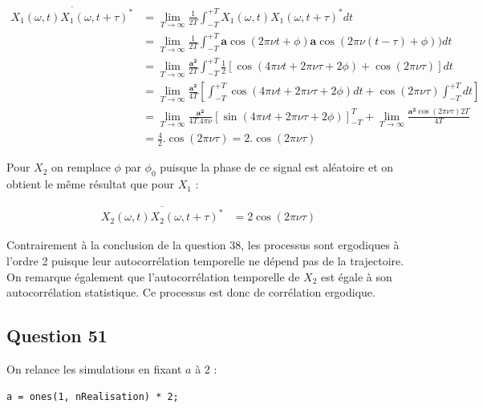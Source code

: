 \documentclass{article}
\begin{document}
\begin{equation}
\begin{aligned}
\overline{X_1(\omega,t)X_1(\omega,t+\tau)^*}
& = \lim_{T\rightarrow\infty} \frac{1}{2T}\int_{-T}^{+T}X_1(\omega,t)X_1(\omega,t+\tau)^*dt \\
& = \lim_{T\rightarrow\infty} \frac{1}{2T}\int_{-T}^{+T} \boldsymbol{a}\cos(2\pi\nu t +\phi)\boldsymbol{a}\cos(2\pi\nu(t-\tau) +\phi)) dt \\
& = \lim_{T\rightarrow\infty} \frac{\boldsymbol{a^2}}{2T}\int_{-T}^{+T} \frac{1}{2}[\cos(4\pi\nu t + 2\pi\nu\tau + 2\phi) + \cos(2\pi\nu\tau)] dt \\
& = \lim_{T\rightarrow\infty} \frac{\boldsymbol{a^2}}{4T} [\int_{-T}^{+T} \cos(4\pi\nu t + 2\pi\nu\tau + 2\phi) dt + \cos(2\pi\nu\tau) \int_{-T}^{+T} dt] \\
& = \lim_{T\rightarrow\infty} \frac{\boldsymbol{a^2}}{4T.4\pi\nu}[\sin(4\pi\nu t + 2\pi\nu\tau + 2\phi)]_{-T}^T + \lim_{T\rightarrow\infty} \frac{\boldsymbol{a^2}\cos(2\pi\nu\tau)2T}{4T} \\
& = \frac{4}{2}.\cos(2\pi\nu\tau) = 2.\cos(2\pi\nu\tau)
\end{aligned}
\end{equation}

Pour $X_2$ on remplace $\phi$ par $\phi_0$ puisque la phase de ce signal est aléatoire et on obtient le même résultat que pour $X_1$ :

\begin{equation}
\begin{aligned}
\overline{X_2(\omega,t)X_2(\omega,t+\tau)^*}
& = 2\cos(2\pi\nu\tau)
\end{aligned}
\end{equation}

\noindent
Contrairement à la conclusion de la question 38, les processus sont ergodiques à l'ordre 2 puisque leur autocorrélation temporelle ne dépend pas de la trajectoire. \\
On remarque également que l'autocorrélation temporelle de $X_2$ est égale à son autocorrélation statistique. Ce processus est donc de corrélation ergodique.

\subsection*{Question 51}

On relance les simulations en fixant $a$ à $2$ :
\begin{verbatim}
a = ones(1, nRealisation) * 2;
\end{verbatim}
\end{document}
